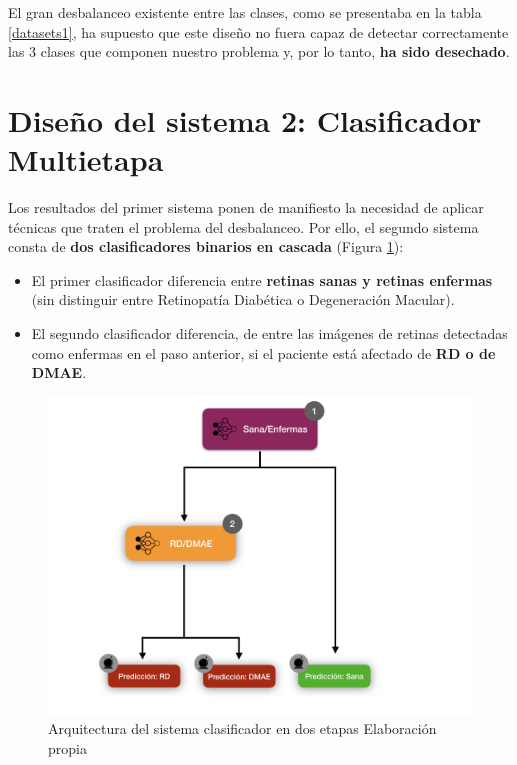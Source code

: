 \documentclass[
  12pt,
  spanish,
  a4paperpaper,
]{report}
\begin{document}
El gran desbalanceo existente entre las clases, como se presentaba en la
tabla \ref{datasets1}, ha supuesto que este diseño no fuera capaz de
detectar correctamente las 3 clases que componen nuestro problema y, por
lo tanto, \textbf{ha sido desechado}.

\hypertarget{diseuxf1o-del-sistema-2-clasificador-multietapa}{%
\section{Diseño del sistema 2: Clasificador
Multietapa}\label{diseuxf1o-del-sistema-2-clasificador-multietapa}}

Los resultados del primer sistema ponen de manifiesto la necesidad de
aplicar técnicas que traten el problema del desbalanceo. Por ello, el
segundo sistema consta de \textbf{dos clasificadores binarios en
cascada} (Figura \ref{design2}):

\begin{itemize}
\item
  El primer clasificador diferencia entre \textbf{retinas sanas y
  retinas enfermas} (sin distinguir entre Retinopatía Diabética o
  Degeneración Macular).
\item
  El segundo clasificador diferencia, de entre las imágenes de retinas
  detectadas como enfermas en el paso anterior, si el paciente está
  afectado de \textbf{RD o de DMAE}.
\end{itemize}

\begin{figure}
\centering
\includegraphics[width=1\textwidth,height=\textheight]{source/figures/design2.png}
\caption{Arquitectura del sistema clasificador en dos etapas Elaboración
propia \label{design2}}
\end{figure}
\end{document}
